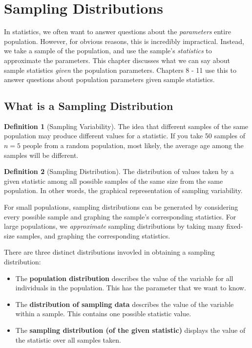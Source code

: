 \documentclass[12pt, a4paper]{article}
\theoremstyle{definition}
\newtheorem{definition}{Definition}
\begin{document}
\newpage

\section{Sampling Distributions}
In statistics, we often want to answer questions about the \textit{parameters} entire population.
However, for obvious reasons, this is incredibly impractical.
Instead, we take a sample of the population, and use the sample's \textit{statistics} to approximate the parameters.
This chapter discusses what we can say about sample statistics \textit{given} the population parameters.
Chapters 8 - 11 use this to answer questions about population parameters given sample statistics.

\subsection{What is a Sampling Distribution}
\begin{definition}[Sampling Variability]
    The idea that different samples of the same population may produce different values for a statistic.
    If you take 50 samples of $n = 5$ people from a random population, most likely, the average age among the samples will be different.
\end{definition}

\begin{definition}[Sampling Distribution]
    The distribution of values taken by a given statistic among all possible samples of the same size from the same population.
    In other words, the graphical representation of sampling variability.
\end{definition}

For small populations, sampling distributions can be generated by considering every possible sample and graphing the sample's corresponding statistics.
For large populations, we \textit{approximate} sampling distributions by taking many fixed-size samples, and graphing the corresponding statistics.

There are three distinct distributions invovled in obtaining a sampling distribution:
\begin{itemize}
    \item The \textbf{population distribution} describes the value of the variable for all individuals in the population. This has the parameter that we want to know.
    \item The \textbf{distribution of sampling data} describes the value of the variable within a sample. This contains one possible statistic value.
    \item The \textbf{sampling distribution (of the given statistic)} displays the value of the statistic over all samples taken.
\end{itemize}
\end{document}
